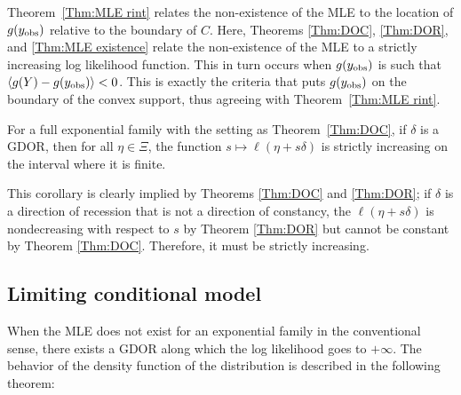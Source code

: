 Theorem~\ref{Thm:MLE rint} relates the non-existence of the MLE to the location
of $g(y_{\textrm{obs}})$ relative to the boundary of $C$.  Here, Theorems \ref{Thm:DOC}, \ref{Thm:DOR}, and \ref{Thm:MLE existence} relate the non-existence of the MLE
to a strictly increasing log likelihood function.  This in turn
occurs when $g(y_{\textrm{obs}})$ is such that $\langle g(Y) - g(y_{\textrm{obs}}) \rangle < 0$.  This is
exactly the criteria that puts $g(y_{\textrm{obs}})$ on the boundary of the convex support,
thus agreeing with Theorem~\ref{Thm:MLE rint}.

\begin{corollary} \label{Cor:strictly increasing}
For a full exponential family with the setting as Theorem~\ref{Thm:DOC}, if $\delta$ is a
GDOR, then for all $\eta \in \Xi$, the function $s \mapsto \ell(\eta+s\delta)$ is strictly
increasing on the interval where it is finite.
\end{corollary}

This corollary is clearly implied by Theorems \ref{Thm:DOC} and \ref{Thm:DOR}; if
$\delta$ is a direction of recession that is not a direction of constancy, 
the $\ell(\eta+s\delta)$ is nondecreasing with respect to $s$ by 
Theorem \ref{Thm:DOR} but cannot be constant by Theorem \ref{Thm:DOC}.  Therefore,
it must be strictly increasing.



\subsection{Limiting conditional model}
When the MLE does not exist for an exponential family in the conventional sense, there 
exists a GDOR along which the log likelihood goes to $+\infty$.  The behavior of the 
density function of the distribution is described in the following theorem:

